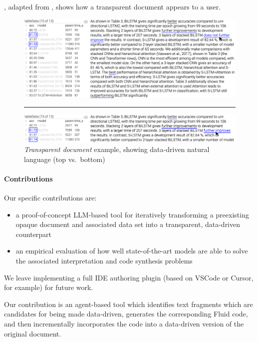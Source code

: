 , adapted from \cite{zhang18}, shows how a transparent document appears to a
user.

\begin{figure}%
    \centering
    \includegraphics[width=\linewidth]{fig/scigen-1805.02474v1-10-with-pointer.png}
    \vspace{1mm}
    \hrule
    \includegraphics[width=\linewidth]{fig/scigen-1805.02474v1-10-counterfactual-with-pointer.png}
    \caption{\emph{Transparent document} example, showing data-driven natural language (top
    vs.~bottom)}
    \label{fig:scigen-example-website}
\end{figure}


\paragraph{Contributions}

Our specific contributions are:

\begin{itemize}
\item a proof-of-concept LLM-based tool for iteratively transforming a preexisting opaque document and
associated data set into a transparent, data-driven counterpart
\item an empirical evaluation of how well state-of-the-art models are able to solve the associated
interpretation and code synthesis problems
\end{itemize}

We leave implementing a full IDE authoring plugin (based on VSCode or Cursor, for example) for future work.

Our contribution is an agent-based tool which identifies text fragments which are candidates for being made
data-driven, generates the corresponding Fluid code, and then incrementally incorporates the code into a
data-driven version of the original document.

